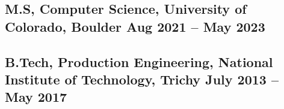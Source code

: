 
\subsection{M.S, Computer Science, University of Colorado, Boulder	\hfill {Aug 2021 -- May 2023}}

\vspace{1mm}

\subsection{B.Tech, Production Engineering, National Institute of Technology, Trichy \hfill	{July 2013 -- May 2017}}

